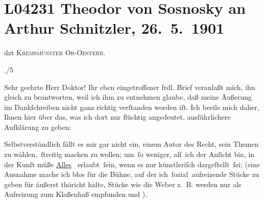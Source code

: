 

\section[Theodor von Sosnosky an Arthur Schnitzler, 26. 5. 1901]{L04231 Theodor von Sosnosky an Arthur Schnitzler, 26. 5. 1901}
\nopagebreak{}
\rehead{ }\normalsize\beginnumbering{}
\toendnotes[C]{\smallbreak\pagebreak[2]}
\toendnotes[C]{\smallbreak}
\toendnotes[C]{\smallbreak}
\pstart
           {\pb}dzt \textsc{Kremsmünster Ob-Oesterr.}\pend
           
./5\pend
           
\pstart{}Sehr geehrte Herr Doktor!\pend\vspace{0.5em}
\pstart
           Ihr eben eingetroffener frdl. Brief veranlaßt mich, ihn gleich zu beantworten, weil
               ich ihm zu entnehmen glaube, daß meine Äußerung im Dankſchreiben nicht ganz richtig
               verſtanden worden iſt. Ich beeile mich daher, Ihnen hier über das, was ich dort nur
               flüchtig angedeutet, ausführlichere Aufklärung zu geben:\pend
           
\pstart
           Selbstverständlich fällt es mir gar nicht ein, einem Autor des Recht, sein Themen zu
               wählen, ſtreitig machen zu wollen; um ſo weniger, alſ ich der Anſicht bin, in der
               Kunſt müße {\pb}\uline{Alles}  erlaubt ſein,
               wenn es nur künstleriſch dargeſtellt ſei; (eine Ausnahme mache ich blos für die
               Bühne, auf der ich \introOben{}ſozial\introOben{} aufreizende Stücke zu geben für
               äußerst thöricht halte, Stücke wie die Weber
               z. B. werden nur als Aufreizung  zum Klaßenhaß
               empfunden und \label{K_L04231-1v}\label{K_L04231-1}).\pend
           
